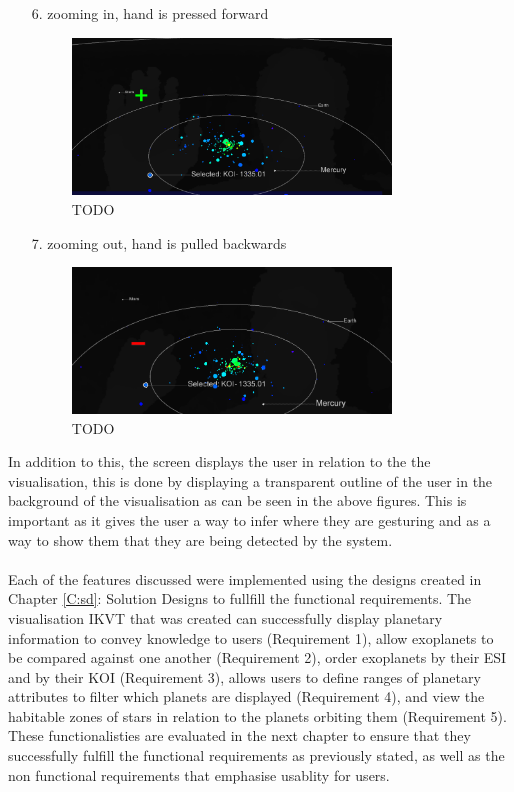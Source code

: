 \begin{enumerate}
 \item[6.] zooming in, hand is pressed forward
 \begin{figure}[H]
  \centering
      \includegraphics[width=0.8\textwidth]{images/in.PNG}
  \caption{TODO}
  \label{fig:in}
\end{figure}

 \item[7.] zooming out, hand is pulled backwards
 
\begin{figure}[H]
  \centering
      \includegraphics[width=0.8\textwidth]{images/out.PNG}
  \caption{TODO}
  \label{fig:out}
\end{figure}

\end{enumerate}

In addition to this, the screen displays the user in relation to the
the visualisation, this is done by displaying a transparent outline of
the user in the background of the visualisation as can be seen in the above
figures. This is important as it gives the user a way to infer where they are
gesturing and as a way to show them that they are being detected by the system.
\\\\
Each of the features discussed were implemented using the designs created in
Chapter \ref{C:sd}: Solution Designs to fullfill the functional requirements.
The visualisation IKVT that was created can successfully display planetary
information to convey knowledge to users (Requirement 1), allow exoplanets to be
compared against one another (Requirement 2), order exoplanets by their ESI and
by their KOI (Requirement 3), allows users to define ranges of planetary
attributes to filter which planets are displayed (Requirement 4), and view the
habitable zones of stars in
relation to the planets orbiting them (Requirement 5). These functionalisties
are evaluated in the next chapter to ensure that they successfully fulfill the
functional requirements as previously stated, as well as the non functional
requirements that emphasise usablity for users.




